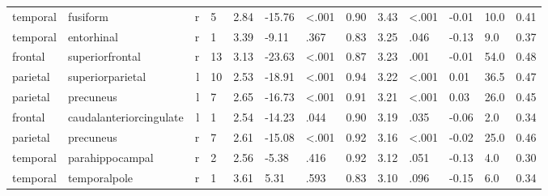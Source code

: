\documentclass{article}
\begin{document}
\begin{longtable}{llrR{1.5cm}R{1cm}R{1.3cm}R{1cm}R{1cm}R{1.3cm}R{1cm}R{1.8cm}R{1.3cm}R{1.8cm}}
  temporal &                  fusiform &    r &            5 &                  2.84 &           -15.76 &      \textless.001 &                               0.90 &                          3.43 &                   \textless.001 & -0.01 &   10.0 &      0.41 \\
  temporal &                entorhinal &    r &            1 &                  3.39 &            -9.11 &               .367 &                               0.83 &                          3.25 &                            .046 & -0.13 &    9.0 &      0.37 \\
   frontal &           superiorfrontal &    r &           13 &                  3.13 &           -23.63 &      \textless.001 &                               0.87 &                          3.23 &                            .001 & -0.01 &   54.0 &      0.48 \\
  parietal &          superiorparietal &    l &           10 &                  2.53 &           -18.91 &      \textless.001 &                               0.94 &                          3.22 &                   \textless.001 &  0.01 &   36.5 &      0.47 \\
  parietal &                 precuneus &    l &            7 &                  2.65 &           -16.73 &      \textless.001 &                               0.91 &                          3.21 &                   \textless.001 &  0.03 &   26.0 &      0.45 \\
   frontal &   caudalanteriorcingulate &    l &            1 &                  2.54 &           -14.23 &               .044 &                               0.90 &                          3.19 &                            .035 & -0.06 &    2.0 &      0.34 \\
  parietal &                 precuneus &    r &            7 &                  2.61 &           -15.08 &      \textless.001 &                               0.92 &                          3.16 &                   \textless.001 & -0.02 &   25.0 &      0.46 \\
  temporal &           parahippocampal &    r &            2 &                  2.56 &            -5.38 &               .416 &                               0.92 &                          3.12 &                            .051 & -0.13 &    4.0 &      0.30 \\
  temporal &              temporalpole &    r &            1 &                  3.61 &             5.31 &               .593 &                               0.83 &                          3.10 &                            .096 & -0.15 &    6.0 &      0.34 \\

\end{longtable}
\end{document}
